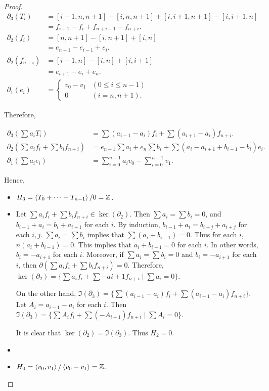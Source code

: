 \documentclass[12pt, psamsfonts]{amsart}
\theoremstyle{definition}
\theoremstyle{remark}
\numberwithin{equation}{section}
\begin{document}
\begin{proof}
  \begin{align*}
    \partial_3(T_i)
      &= [i + 1, n, n + 1] - [i, n, n + 1] + [i, i + 1, n + 1] - [i, i + 1, n] \\
      &= f_{i + 1} - f_i + f_{n + i - 1} - f_{n + i}. \\
    \partial_2(f_i)
      &= [n, n + 1] - [i, n + 1] + [i, n] \\
      &= e_{n + 1} - e_{i - 1} + e_i. \\
    \partial_2(f_{n + i})
      &= [i + 1, n] - [i, n] + [i, i + 1] \\
      &= e_{i + 1} - e_{i} + e_n. \\
    \partial_1(e_i) &= \begin{cases}
      v_0 - v_1 & (0 \leq i \leq n - 1) \\
      0 & (i = n, n + 1).
    \end{cases} 
  \end{align*}

  Therefore,

  \begin{align*}
    \partial_3(\sum a_iT_i) &= \sum (a_{i - 1} - a_i)f_i + \sum (a_{i + 1} - a_i) f_{n + i}. \\
    \partial_2(\sum a_if_i + \sum b_if_{n + i}) &= e_{n + 1}\sum a_i + e_n\sum b_i + \sum (a_i - a_{i + 1} + b_{i - 1} - b_i) e_i.\\
    \partial_1(\sum a_i e_i) &= \sum_{i=0}^{n-1} a_i v_0 - \sum_{i=0}^{n-1} v_1.
  \end{align*}

  Hence,

  \begin{itemize}
    \item
      $H_3 = \ev{ T_0 + \cdots + T_{n - 1} } / 0 = \mathbb{Z}$.
    \item
      Let $\sum a_if_i + \sum b_if_{n + i} \in \ker(\partial_2)$.
      Then $\sum a_i = \sum b_i = 0$, and $b_{i - 1} + a_i = b_i + a_{i + 1}$ for each $i$.
      By induction, $b_{i - 1} + a_i = b_{i + j} + a_{i + j}$ for each $i, j$.
      $\sum a_i = \sum b_i$ implies that $\sum (a_i + b_{i - 1}) = 0$.
      Thus for each $i$, $n(a_i + b_{i - 1}) = 0$.
      This implies that $a_i + b_{i - 1} = 0$ for each $i$.
      In other words, $b_i = -a_{i + 1}$ for each $i$.
      Moreover, if $\sum a_i = \sum b_i = 0$ and $b_i = -a_{i + 1}$ for each $i$, then $\partial(\sum a_if_i + \sum b_if_{n + i}) = 0$.
      Therefore, $\ker(\partial_2) = \{ \sum a_if_i + \sum -a{i + 1}f_{n + i} \mid \sum a_i = 0 \}$.

      On the other hand, $\Im(\partial_3) = \{ \sum (a_{i - 1} - a_i) f_i + \sum (a_{i + 1} - a_i) f_{n + i} \}$.
      Let $A_i = a_{i - 1} - a_i$ for each $i$.
      Then $\Im(\partial_3) = \{ \sum A_if_i + \sum (-A_{i + 1})f_{n + i} \mid \sum A_i = 0 \}$.

      It is clear that $\ker(\partial_2) = \Im(\partial_3)$.
      Thus $H_2 = 0$.
    \item
    \item
      $H_0 = \ev{ v_0, v_1 } / \ev{ v_0 - v_1 } = \mathbb{Z}.$
  \end{itemize}
\end{proof}
\end{document}
